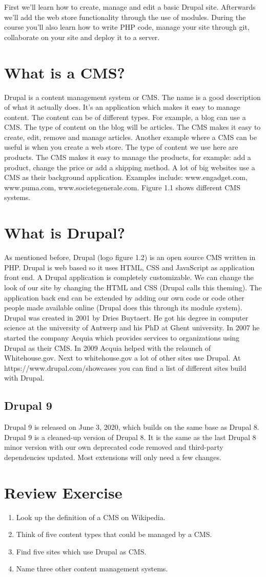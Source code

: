First we’ll learn how to create, manage and edit a basic Drupal site. Afterwards we’ll add the web store functionality through the use of modules. During the course you’ll also learn how to write PHP code, manage your site through git, collaborate on your site and deploy it to a server.

\section{What is a CMS?}
Drupal is a content management system or CMS. The name is a good description of what it actually does. It’s an application which makes it easy to manage content. The content can be of different types. For example, a blog can use a CMS. The type of content on the blog will be articles. The CMS makes it easy to create, edit, remove and manage articles. Another example where a CMS can be useful is when you create a web store. The type of content we use here are products. The CMS makes it easy to manage the products, for example: add a product, change the price or add a shipping method.
A lot of big websites use a CMS as their background application. Examples include: www.engadget.com, www.puma.com, www.societegenerale.com. Figure 1.1 shows different CMS systems.

\section{What is Drupal?}
As mentioned before, Drupal (logo figure 1.2) is an open source CMS written in PHP. Drupal is web based so it uses HTML, CSS and JavaScript as application front end. A Drupal application is completely customizable. We can change the look of our site by changing the HTML and CSS (Drupal calls this theming).
The application back end can be extended by adding our own code or code other people made available online (Drupal does this through its module system).
Drupal was created in 2001 by Dries Buytaert. He got his degree in computer science at the university of Antwerp and his PhD at Ghent university. In 2007 he started the company Acquia which provides services to organizations using Drupal as their CMS. In 2009 Acquia helped with the relaunch of Whitehouse.gov. Next to whitehouse.gov a lot of other sites use Drupal. At https://www.drupal.com/showcases you can find a list of different sites build with Drupal.

\subsection{Drupal 9}
Drupal 9 is released on June 3, 2020, which builds on the same base as Drupal 8. Drupal 9 is a cleaned-up version of Drupal 8. It is the same as the last Drupal 8 minor version with our own deprecated code removed and third-party dependencies updated. Most extensions will only need a few changes.

\section{Review Exercise}
\begin{enumerate}
    \item Look up the definition of a CMS on Wikipedia.
    \item Think of five content types that could be managed by a CMS.
    \item Find five sites which use Drupal as CMS.
    \item Name three other content management systems.
\end{enumerate}
